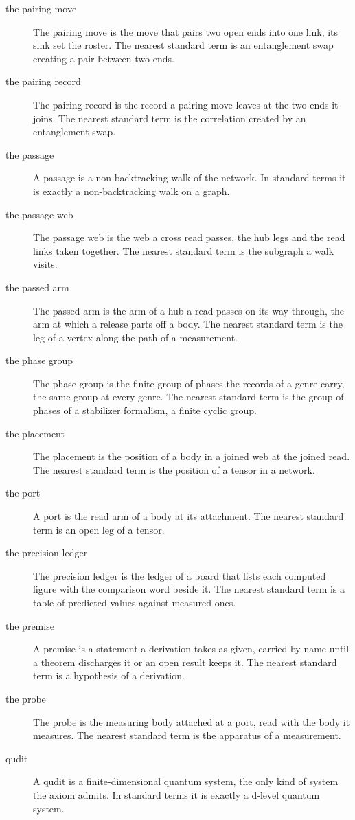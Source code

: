 \begin{description}
\item[the pairing move] The pairing move is the move that pairs two open ends into one link, its sink set the roster. The nearest standard term is an entanglement swap creating a pair between two ends.
\item[the pairing record] The pairing record is the record a pairing move leaves at the two ends it joins. The nearest standard term is the correlation created by an entanglement swap.
\item[the passage] A passage is a non-backtracking walk of the network. In standard terms it is exactly a non-backtracking walk on a graph.
\item[the passage web] The passage web is the web a cross read passes, the hub legs and the read links taken together. The nearest standard term is the subgraph a walk visits.
\item[the passed arm] The passed arm is the arm of a hub a read passes on its way through, the arm at which a release parts off a body. The nearest standard term is the leg of a vertex along the path of a measurement.
\item[the phase group] The phase group is the finite group of phases the records of a genre carry, the same group at every genre. The nearest standard term is the group of phases of a stabilizer formalism, a finite cyclic group.
\item[the placement] The placement is the position of a body in a joined web at the joined read. The nearest standard term is the position of a tensor in a network.
\item[the port] A port is the read arm of a body at its attachment. The nearest standard term is an open leg of a tensor.
\item[the precision ledger] The precision ledger is the ledger of a board that lists each computed figure with the comparison word beside it. The nearest standard term is a table of predicted values against measured ones.
\item[the premise] A premise is a statement a derivation takes as given, carried by name until a theorem discharges it or an open result keeps it. The nearest standard term is a hypothesis of a derivation.
\item[the probe] The probe is the measuring body attached at a port, read with the body it measures. The nearest standard term is the apparatus of a measurement.
\item[qudit] A qudit is a finite-dimensional quantum system, the only kind of system the axiom admits. In standard terms it is exactly a d-level quantum system.

\end{description}
